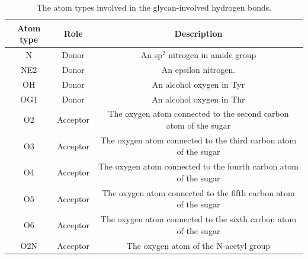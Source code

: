 \documentclass[9pt]{elife}
\begin{document}
\begin{table}[H]
\centering
\begin{tabular}{|c|c|c|}
\hline
Atom type & Role     & Description                                                      \\ \hline
N         & Donor    & An sp$^{2}$ nitrogen in amide group                              \\ \hline
NE2       & Donor    & An epsilon nitrogen.                                             \\ \hline
OH        & Donor    & An alcohol oxygen in Tyr                                        \\ \hline
OG1       & Donor    & An alcohol oxygen in Thr                                        \\ \hline
O2        & Acceptor & The oxygen atom connected to the second carbon atom of the sugar \\ \hline
O3        & Acceptor & The oxygen atom connected to the third carbon atom of the sugar  \\ \hline
O4        & Acceptor & The oxygen atom connected to the fourth carbon atom of the sugar \\ \hline
O5        & Acceptor & The oxygen atom connected to the fifth carbon atom of the sugar  \\ \hline
O6        & Acceptor & The oxygen atom connected to the sixth carbon atom of the sugar  \\ \hline
O2N       & Acceptor & The oxygen atom of the N-acetyl group                            \\ \hline
\end{tabular}
\caption{The atom types involved in the glycan-involved hydrogen bonds.}
\label{supple_tab: atom_types}
\end{table}
\end{document}

